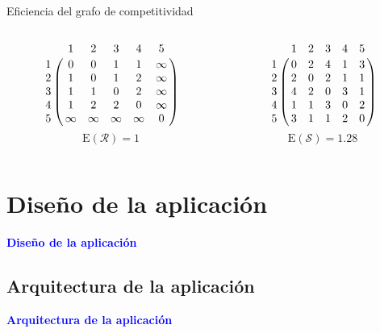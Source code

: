 \documentclass[10pt]{beamer}
\begin{document}
	\begin{frame}{Eficiencia del grafo de competitividad}
		\begin{ejemplo}[continuación]
			\begin{columns}[t] %
				\begin{column}{.50\textwidth}
					\begin{equation*}
					\bordermatrix{
						& 1 & 2 & 3 & 4 & 5 \cr
						1 &	0 & 0 & 1 & 1 & \infty \cr
						2 & 1 & 0 & 1 & 2 & \infty \cr
						3 & 1 & 1 & 0 & 2 & \infty \cr
						4 & 1 & 2 & 2 & 0 & \infty \cr
						5 & \infty & \infty & \infty & \infty  &  0  \cr
					}
					\end{equation*}
					\[ \mathrm{E}(\mathcal{R}) = 1 \]
				\end{column}%
				\hfill%
				\begin{column}{.50\textwidth}
					\begin{equation*}
					\bordermatrix{
						& 1 & 2 & 3 & 4 & 5 \cr
						1 &	0 & 2 & 4 & 1 & 3 \cr
						2 & 2 & 0 & 2 & 1 & 1 \cr
						3 & 4 & 2 & 0 & 3 & 1 \cr
						4 & 1 & 1 & 3 & 0 & 2 \cr
						5 & 3 & 1 & 1 & 2 & 0  \cr
					}
					\end{equation*}
					\[ \mathrm{E}(\mathcal{S}) = 1.28 \]
				\end{column}%
			\end{columns}
		\end{ejemplo}
	\end{frame}
	
	\section{Diseño de la aplicación}
	
	\begin{frame}
		\begin{center}
			\Huge\textbf{\textsf{\textcolor{blue}{Diseño de la aplicación}}}
		\end{center}
	\end{frame}
	
	\subsection{Arquitectura de la aplicación}
	
	\begin{frame}
		\begin{center}
			\Huge\textbf{\textsf{\textcolor{blue}{Arquitectura de la aplicación}}}
		\end{center}
	\end{frame}
	
\end{document}

